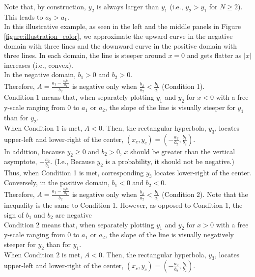 \documentclass[11pt, a4paper]{article}
\begin{document}
Note that, by construction, $y_2$ is always larger than $y_1$ (i.e., $y_2>y_1$ for $N \geq2$). This leads to $a_2>a_1$.\\

\noindent
In this illustrative example, as seen in the left and the middle panels in Figure \ref{figure:illustration_color}, we approximate the upward curve in the negative domain with three lines and the downward curve in the positive domain with three lines. In each domain, the line is steeper around $x=0$ and gets flatter as $|x|$ increases (i.e., convex).\\

\noindent
In the negative domain, $b_1>0$ and $b_2>0$.\\
Therefore, $A = \frac{a_1-\frac{a_2 b_1}{b_2}}{b_2}$ is negative only when $\frac{b_2}{a_2} < \frac{b_1}{a_1}$ (Condition 1).\\
Condition 1 means that, when separately plotting $y_1$ and $y_2$ for $x<0$ with a free y-scale ranging from 0 to $a_1$ or $a_2$, the slope of the line is visually steeper for $y_1$ than for $y_2$.\\

\noindent
When Condition 1 is met, $A<0$. Then, the rectangular hyperbola, $y_3$, locates upper-left and lower-right of the center, $(x_c, y_c) = (-\frac{a_2}{b_2}, \frac{b_1}{b_2})$.\\ 

\noindent
In addition, because $y_2 \geq 0$ and $b_2>0$, $x$ should be greater than the vertical asymptote, $-\frac{a_2}{b_2}$. (I.e., Because $y_2$ is a probability, it should not be negative.) Thus, when Condition 1 is met, corresponding $y_3$ locates lower-right of the center. \\

\noindent
Conversely, in the positive domain, $b_1<0$ and $b_2<0$.\\
Therefore, $A = \frac{a_1-\frac{a_2 b_1}{b_2}}{b_2}$ is negative only when $\frac{b_2}{a_2} < \frac{b_1}{a_1}$ (Condition 2). Note that the inequality is the same to Condition 1. However, as opposed to Condition 1, the sign of $b_1$ and $b_2$ are negative\\
Condition 2 means that, when separately plotting $y_1$ and $y_2$ for $x>0$ with a free y-scale ranging from 0 to $a_1$ or $a_2$, the slope of the line is visually negatively steeper for $y_2$ than for $y_1$.\\

\noindent
When Condition 2 is met, $A<0$. Then, the rectangular hyperbola, $y_3$, locates upper-left and lower-right of the center, $(x_c, y_c) = (-\frac{a_2}{b_2}, \frac{b_1}{b_2})$.\\ 
\end{document}
